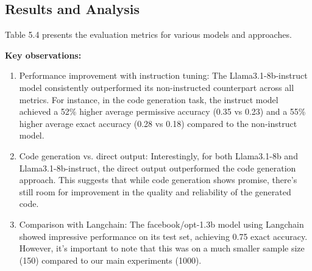 \documentclass[logo,msc]{infthesis}           %
\begin{document}
\subsection{Results and Analysis}
Table 5.4 presents the evaluation metrics for various models and approaches.
\begin{table}[h!]
\centering
\caption{Evaluation Metrics for Code Generation}
\label{table:metrics}
\end{table}


\textbf{Key observations:}
\begin{enumerate}

    \item Performance improvement with instruction tuning: The Llama3.1-8b-instruct model consistently outperformed its non-instructed counterpart across all metrics. For instance, in the code generation task, the instruct model achieved a 52\% higher average permissive accuracy (0.35 vs 0.23) and a 55\% higher average exact accuracy (0.28 vs 0.18) compared to the non-instruct model.
    \item Code generation vs. direct output: Interestingly, for both Llama3.1-8b and Llama3.1-8b-instruct, the direct output outperformed the code generation approach. This suggests that while code generation shows promise, there's still room for improvement in the quality and reliability of the generated code.
    \item Comparison with Langchain: The facebook/opt-1.3b model using Langchain showed impressive performance on its test set, achieving 0.75 exact accuracy. However, it's important to note that this was on a much smaller sample size (150) compared to our main experiments (1000).

\end{enumerate}
\end{document}
